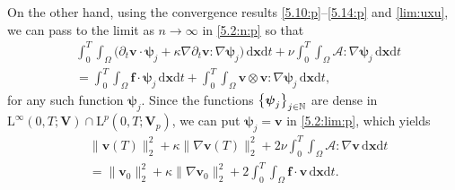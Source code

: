 \documentclass[12pt,reqno]{amsart}
\numberwithin{equation}{section}
\let\originalleft\left
\let\originalright\right
\renewcommand{\left}{\mathopen{}\mathclose\bgroup\originalleft}
\renewcommand{\right}{\aftergroup\egroup\originalright}
\theoremstyle{definition}
\def\dxt{\,\mathrm{d}\boldsymbol{x}\mathrm{d}t}
\def\L{\mathrm{L}}
\def\vv{\boldsymbol{v}}
\def\f{\boldsymbol{f}}
\def\N{\mathbb{N}}
\def\bfV{\mathbf{V}}
\def\bmcA{\boldsymbol{\mathcal{A}}}
\def\bpsi{\boldsymbol{\psi}}
\begin{document}
On the other hand, using the convergence results \eqref{5.10:p}--\eqref{5.14:p} and \eqref{lim:uxu},  we can pass to the limit as $n\to\infty$ in \eqref{5.2:n:p} so that
\begin{equation}\label{5.2:lim:p}%
\begin{split}
&
\!\int_{0}^{T}\!\!\!\!\int_{\Omega}\big({\partial_t\vv}\cdot\bpsi_j  + \kappa\nabla{\partial_t\vv}:\nabla\bpsi_j\big)\dxt +
\nu\!\int_{0}^{T}\!\!\!\!\int_{\Omega}\bmcA:\nabla\bpsi_j\dxt \\
&=
\!\int_{0}^{T}\!\!\!\!\int_{\Omega}\f\cdot\bpsi_j\dxt + \!\int_{0}^{T}\!\!\!\!\int_{\Omega}\vv\otimes\vv:\nabla\bpsi_j\dxt,
\end{split}
\end{equation}
for any such function $\bpsi_j$.
Since the functions $\left\{\bpsi_j\right\}_{j\in\N}$ are dense in $\L^\infty(0,T;\bfV)\cap\L^p(0,T;\bfV_p)$, we can put $\bpsi_j=\vv$ in \eqref{5.2:lim:p}, which yields
\begin{equation}\label{5.2:lim:u:p}
  \begin{split}
  & \|\vv(T)\|^2_{2}+\kappa\|\nabla\vv(T)\|_{2}^2+2\nu \!\int_{0}^{T}\!\!\!\!\int_{\Omega} \bmcA:\nabla\vv \dxt
  \\
  & =
  \|\vv_0\|^2_{2}+\kappa\|\nabla\vv_0\|_{2}^2+2\!\int_{0}^{T}\!\!\!\!\int_{\Omega}\f\cdot\vv \dxt.
  \end{split}
\end{equation}
\end{document}
